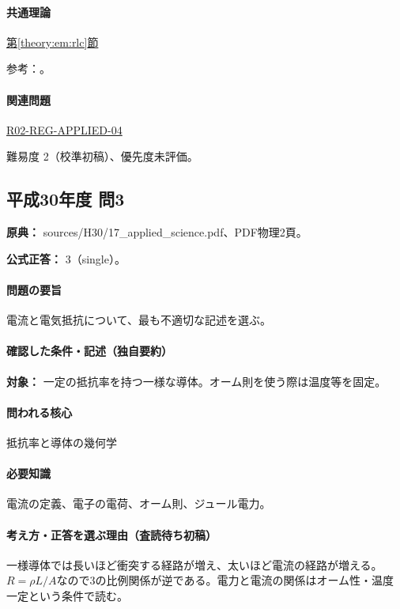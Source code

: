 \paragraph{共通理論} \hyperref[theory:em:rlc]{第\ref*{theory:em:rlc}節}

\par 参考：\cite{mit_em12}。

\paragraph{関連問題} \hyperref[q:r02-reg-applied-04]{R02-REG-APPLIED-04}

\par 難易度 2（校準初稿）、優先度未評価。

\subsection{平成30年度 問3}
\label{q:h30-reg-applied-03}

\noindent\textbf{原典：} sources/H30/17\_applied\_science.pdf、PDF物理2頁。

\textbf{公式正答：} 3（single）。

\paragraph{問題の要旨} 電流と電気抵抗について、最も不適切な記述を選ぶ。

\paragraph{確認した条件・記述（独自要約）}\mbox{}\par

\noindent\textbf{対象：} 一定の抵抗率を持つ一様な導体。オーム則を使う際は温度等を固定。\par

\paragraph{問われる核心} 抵抗率と導体の幾何学

\paragraph{必要知識} 電流の定義、電子の電荷、オーム則、ジュール電力。

\paragraph{考え方・正答を選ぶ理由（査読待ち初稿）} 一様導体では長いほど衝突する経路が増え、太いほど電流の経路が増える。\(R=\rho L/A\)なので3の比例関係が逆である。電力と電流の関係はオーム性・温度一定という条件で読む。

